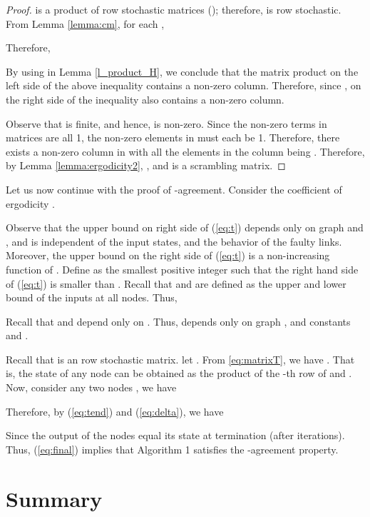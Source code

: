 \documentclass{llncs}
\newcommand{\fillbox}{\hspace*{\fill}}
\begin{document}
\begin{proof}

 is a product of row stochastic matrices (); therefore,
 is row stochastic.
From Lemma \ref{lemma:cm}, for each ,

Therefore, 

By using  in Lemma \ref{l_product_H},
we conclude that the matrix product on the left side
of the above inequality contains a non-zero column. Therefore, since ,  on the
right side of the inequality also contains
a non-zero column.

Observe that  is finite, and hence, 
is non-zero. Since the non-zero terms in  matrices are all 1,
the non-zero elements in 
must each be  1. Therefore, there exists a non-zero column in 
with all the elements in the column being .
Therefore, by Lemma \ref{lemma:ergodicity2}, , and  is a scrambling matrix. 
\fillbox
\end{proof}

Let us now continue with the proof of -agreement. Consider the coefficient of ergodicity .






Observe that the upper bound on right side of (\ref{eq:t}) depends only on graph  and , and is
independent of the input states, and the behavior of the faulty links. Moreover, the
upper bound on the right side of (\ref{eq:t}) is a non-increasing function of . Define  as the smallest positive integer such that the right hand side of (\ref{eq:t}) is smaller than . Recall that  and  are defined as the upper and lower bound of the inputs at all nodes. Thus,



Recall that  and  depend only on . Thus,  depends only on graph , and constants  and .

Recall that  is an  row stochastic matrix. let . From \ref{eq:matrixT}, we have . That is, the state of any node  can be obtained as the product of the -th row of  and . Now, consider any two nodes , we have





Therefore, by (\ref{eq:tend}) and (\ref{eq:delta}), we have



Since the output of the nodes equal its state at termination (after  iterations). Thus, (\ref{eq:final}) implies that Algorithm 1 satisfies the -agreement property.

\section{Summary}
\end{document}
